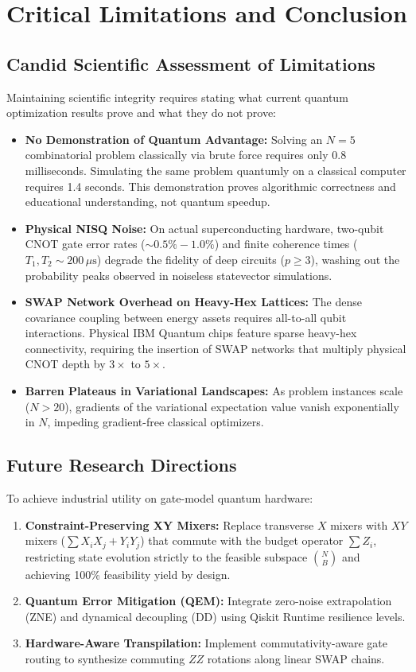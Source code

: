 \section{Critical Limitations and Conclusion}

\subsection{Candid Scientific Assessment of Limitations}
Maintaining scientific integrity requires stating what current quantum optimization results prove and what they do not prove:
\begin{itemize}
    \item \textbf{No Demonstration of Quantum Advantage:} Solving an $N=5$ combinatorial problem classically via brute force requires only 0.8 milliseconds. Simulating the same problem quantumly on a classical computer requires 1.4 seconds. This demonstration proves algorithmic correctness and educational understanding, not quantum speedup.
    \item \textbf{Physical NISQ Noise:} On actual superconducting hardware, two-qubit CNOT gate error rates ($\sim 0.5\%-1.0\%$) and finite coherence times ($T_1, T_2 \sim 200\,\mu\text{s}$) degrade the fidelity of deep circuits ($p \ge 3$), washing out the probability peaks observed in noiseless statevector simulations.
    \item \textbf{SWAP Network Overhead on Heavy-Hex Lattices:} The dense covariance coupling between energy assets requires all-to-all qubit interactions. Physical IBM Quantum chips feature sparse heavy-hex connectivity, requiring the insertion of SWAP networks that multiply physical CNOT depth by $3\times$ to $5\times$.
    \item \textbf{Barren Plateaus in Variational Landscapes:} As problem instances scale ($N > 20$), gradients of the variational expectation value vanish exponentially in $N$, impeding gradient-free classical optimizers.
\end{itemize}

\subsection{Future Research Directions}
To achieve industrial utility on gate-model quantum hardware:
\begin{enumerate}
    \item \textbf{Constraint-Preserving XY Mixers:} Replace transverse $X$ mixers with $XY$ mixers ($\sum X_i X_j + Y_i Y_j$) that commute with the budget operator $\sum Z_i$, restricting state evolution strictly to the feasible subspace $\binom{N}{B}$ and achieving 100\% feasibility yield by design.
    \item \textbf{Quantum Error Mitigation (QEM):} Integrate zero-noise extrapolation (ZNE) and dynamical decoupling (DD) using Qiskit Runtime resilience levels.
    \item \textbf{Hardware-Aware Transpilation:} Implement commutativity-aware gate routing to synthesize commuting $ZZ$ rotations along linear SWAP chains.
\end{enumerate}

